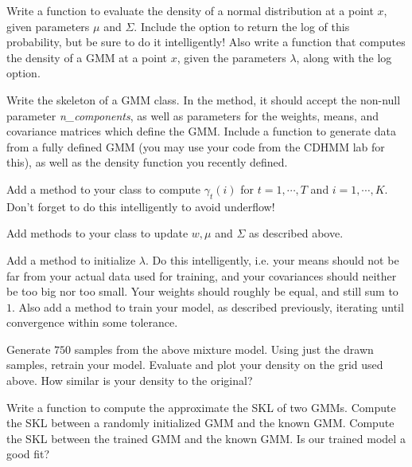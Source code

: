 
Write a function to evaluate the density of a normal distribution at a point $x$, given parameters $\mu$ and $\Sigma$. Include the option to return the log of this probability, but be sure to do it intelligently! Also write a function that computes the density of a GMM at a point $x$, given the parameters $\lambda$, along with the log option.

Write the skeleton of a GMM class. In the  method, it should accept the non-null parameter \emph{n\_components}, as well as parameters for the weights, means, and covariance matrices which define the GMM. Include a function to generate data from a fully defined GMM (you may use your code from the CDHMM lab for this), as well as the density function you recently defined.

Add a method to your class to compute $\gamma_{t}(i)$ for $t = 1, \cdots, T$ and $i = 1, \cdots, K$. Don't forget to do this intelligently to avoid underflow!

Add methods to your class to update $w, \mu$ and $\Sigma$ as described above.

Add a method to initialize $\lambda$. Do this intelligently, i.e. your means should not be far from your actual data used for training, and your covariances should neither be too big nor too small. Your weights should roughly be equal, and still sum to $1$. Also add a method to train your model, as described previously, iterating until convergence within some tolerance.

Generate $750$ samples from the above mixture model. Using just the drawn samples, retrain your model. Evaluate and plot your density on the grid used above. How similar is your density to the original?

Write a function to compute the approximate the SKL of two GMMs. Compute the SKL between a randomly initialized GMM and the known GMM. Compute the SKL between the trained GMM and the known GMM. Is our trained model a good fit?
